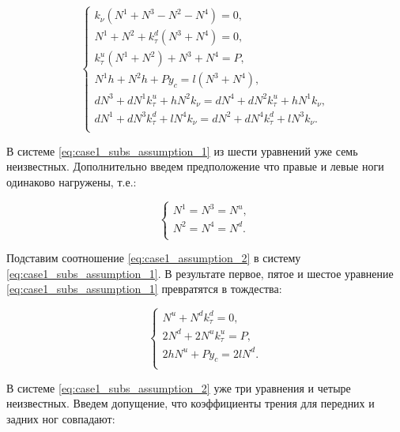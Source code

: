 \begin{equation}
\label{eq:case1_subs_assumption_1}
  \left\{
    \begin{alignedat}{3}
      k_\nu(N^1 + N^3 - N^2 - N^4) = 0,\\
      N^1 + N^2 + k_\tau^d(N^3 + N^4) = 0,\\
      k_\tau^u(N^1 + N^2) + N^3 + N^4 = P,\\
      N^1h + N^2h + Py_c = l(N^3 + N^4), \\      
      dN^3 + dN^1k_\tau^u + hN^2k_\nu = dN^4 + dN^2k_\tau^u + hN^1k_\nu,\\
      dN^1 + dN^3k_\tau^d + lN^4k_\nu = dN^2 + dN^4k_\tau^d + lN^3k_\nu.\\
    \end{alignedat}
  \right.
\end{equation}

В системе \ref{eq:case1_subs_assumption_1} из шести уравнений уже семь неизвестных. Дополнительно введем предположение что правые и левые ноги одинаково нагружены, т.е.:

\begin{equation}
\label{eq:case1_assumption_2}
  \left\{
    \begin{alignedat}{3}
    N^1 = N^3 = N^u, \\
    N^2 = N^4 = N^d. \\
    \end{alignedat}
  \right.
\end{equation}


Подставим соотношение \ref{eq:case1_assumption_2} в систему \ref{eq:case1_subs_assumption_1}. В результате первое, пятое и шестое уравнение \ref{eq:case1_subs_assumption_1} превратятся в тождества:

\begin{equation}
\label{eq:case1_subs_assumption_2}
  \left\{
  \begin{alignedat}{3}
    N^u + N^dk_\tau^d = 0, \\
    2N^d + 2N^uk_\tau^u = P, \\
    2hN^u + Py_c = 2lN^d.\\
  \end{alignedat}
  \right.
\end{equation}

В системе \ref{eq:case1_subs_assumption_2} уже три уравнения и четыре неизвестных. Введем допущение, что коэффициенты трения для передних и задних ног совпадают: 

